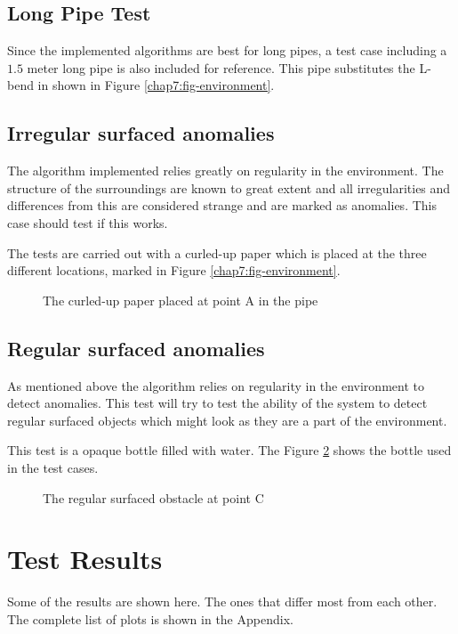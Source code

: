 \subsection{Long Pipe Test}
Since the implemented algorithms are best for long pipes, a test case including a
$1.5$ meter long pipe is also included for reference. This pipe substitutes the L-bend in
shown in Figure \ref{chap7:fig-environment}.


\subsection{Irregular surfaced anomalies}
The algorithm implemented relies greatly on regularity in the environment. The structure
of the surroundings are known to great extent and all irregularities and differences from
this are considered strange and are marked as anomalies. This case should test if this
works.

The tests are carried out with a curled-up paper which is placed at the three different
locations, marked in Figure \ref{chap7:fig-environment}. 
\begin{figure}[htbp]
    \centering
    \caption{The curled-up paper placed at point A in the pipe}
    \label{chap7:fig-culed-up-paper-at-A}
\end{figure}



\subsection{Regular surfaced anomalies}
As mentioned above the algorithm relies on regularity in the environment to detect
anomalies. This test will try to test the ability of the system to detect regular surfaced
objects which might look as they are a part of the environment. 

This test is a opaque bottle filled with water. The Figure \ref{chap7:fig-regular-at-C}
shows the bottle used in the test cases.

\begin{figure}[htbp]
    \centering
    \caption{The regular surfaced obstacle at point C}
    \label{chap7:fig-regular-at-C}
\end{figure}



\section{Test Results}
Some of the results are shown here. The ones that differ most from each other. The
complete list of plots is shown in the Appendix. 

